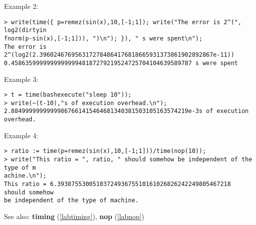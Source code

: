\noindent Example 2: 
\begin{center}\begin{minipage}{15cm}\begin{Verbatim}[frame=single]
> write(time({ p=remez(sin(x),10,[-1;1]); write("The error is 2^(", log2(dirtyin
fnorm(p-sin(x),[-1;1])), ")\n"); }), " s were spent\n");
The error is 2^(log2(2.3960246769563172784864176818665931373861902892867e-11))
0.458635999999999999948187279219524725704104639589787 s were spent
\end{Verbatim}
\end{minipage}\end{center}
\noindent Example 3: 
\begin{center}\begin{minipage}{15cm}\begin{Verbatim}[frame=single]
> t = time(bashexecute("sleep 10"));
> write(~(t-10),"s of execution overhead.\n");
2.88499999999999867661415464681340381503105163574219e-3s of execution overhead.
\end{Verbatim}
\end{minipage}\end{center}
\noindent Example 4: 
\begin{center}\begin{minipage}{15cm}\begin{Verbatim}[frame=single]
> ratio := time(p=remez(sin(x),10,[-1;1]))/time(nop(10));
> write("This ratio = ", ratio, " should somehow be independent of the type of m
achine.\n");
This ratio = 6.3938755300510372493675510161026826242249805467218 should somehow 
be independent of the type of machine.
\end{Verbatim}
\end{minipage}\end{center}
See also: \textbf{timing} (\ref{labtiming}), \textbf{nop} (\ref{labnop})
